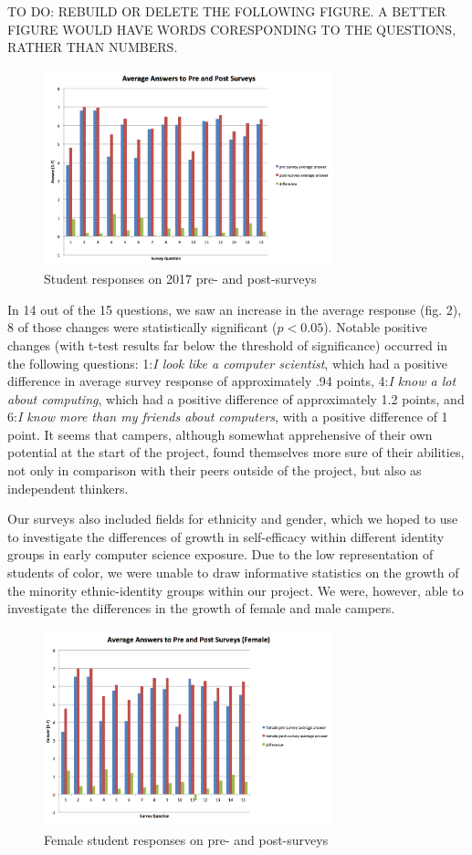 TO DO: REBUILD OR DELETE THE FOLLOWING FIGURE.  A BETTER FIGURE WOULD
HAVE WORDS CORESPONDING TO THE QUESTIONS, RATHER THAN NUMBERS.

\begin{figure}
\includegraphics[width=3.3in]{images/AvgAnswersAll}
\caption{Student responses on 2017 pre- and post-surveys}
\end{figure}

In 14 out of the 15 questions, we saw an increase in the
average response (fig. 2), 8 of those changes were statistically
significant ($p < 0.05$). Notable positive changes (with t-test
results far below the threshold of significance) occurred in the
following questions: 1:\textit{I look like a computer scientist}, which
had a positive difference in average survey response of approximately
.94 points, 4:\textit{I know a lot about computing}, which had a positive
difference of approximately 1.2 points, and 6:\textit{I know more than
my friends about computers}, with a positive difference of 1 point.
It seems that campers, although somewhat apprehensive of their own
potential at the start of the project, found themselves more sure
of their abilities, not only in comparison with their peers outside
of the project, but also as independent thinkers.

Our surveys also included fields for ethnicity and gender, which
we hoped to use to investigate the differences of growth in
self-efficacy within different identity groups in early computer
science exposure. Due to the low representation of students of
color, we were unable to draw informative statistics on the growth
of the minority ethnic-identity groups within our project. We were,
however, able to investigate the differences in the growth of female
and male campers.

\begin{figure}
\includegraphics[width=3.3in]{images/AvgAnswersFemale}
\caption{Female student responses on pre- and post-surveys}
\end{figure}

